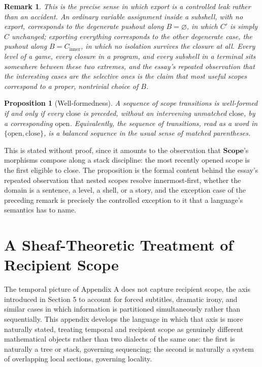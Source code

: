 \documentclass[11pt]{article}
\newtheorem{proposition}{Proposition}
\newtheorem{remark}{Remark}
\begin{document}
\begin{remark}
This is the precise sense in which export is a controlled leak rather than an accident. An ordinary variable assignment inside a subshell, with no export, corresponds to the degenerate pushout along $B = \varnothing$, in which $C'$ is simply $C$ unchanged; exporting everything corresponds to the other degenerate case, the pushout along $B = C_{\mathrm{inner}}$, in which no isolation survives the closure at all. Every level of a game, every closure in a program, and every subshell in a terminal sits somewhere between these two extremes, and the essay's repeated observation that the interesting cases are the selective ones is the claim that most useful scopes correspond to a proper, nontrivial choice of $B$.
\end{remark}

\begin{proposition}[Well-formedness]
A sequence of scope transitions is well-formed if and only if every $\mathrm{close}$ is preceded, without an intervening unmatched $\mathrm{close}$, by a corresponding $\mathrm{open}$. Equivalently, the sequence of transitions, read as a word in $\{\mathrm{open}, \mathrm{close}\}$, is a balanced sequence in the usual sense of matched parentheses.
\end{proposition}

This is stated without proof, since it amounts to the observation that $\mathbf{Scope}$'s morphisms compose along a stack discipline: the most recently opened scope is the first eligible to close. The proposition is the formal content behind the essay's repeated observation that nested scopes resolve innermost-first, whether the domain is a sentence, a level, a shell, or a story, and the exception case of the preceding remark is precisely the controlled exception to it that a language's semantics has to name.

\section{A Sheaf-Theoretic Treatment of Recipient Scope}

The temporal picture of Appendix A does not capture recipient scope, the axis introduced in Section 5 to account for forced subtitles, dramatic irony, and similar cases in which information is partitioned simultaneously rather than sequentially. This appendix develops the language in which that axis is more naturally stated, treating temporal and recipient scope as genuinely different mathematical objects rather than two dialects of the same one: the first is naturally a tree or stack, governing sequencing; the second is naturally a system of overlapping local sections, governing locality.
\end{document}
